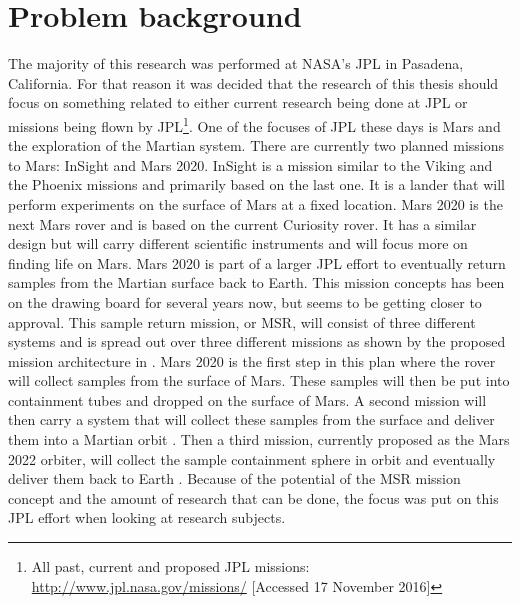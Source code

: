 \chapter{Problem background}

\label{ch:problembackground}
The majority of this research was performed at NASA's \ac{JPL} in Pasadena, California. For that reason it was decided that the research of this thesis should focus on something related to either current research being done at \ac{JPL} or missions being flown by \ac{JPL}\footnote{All past, current and proposed \ac{JPL} missions: \url{http://www.jpl.nasa.gov/missions/} [Accessed 17 November 2016]}.   One of the focuses of \ac{JPL} these days is Mars and the exploration of the Martian system. There are currently two planned missions to Mars: InSight and Mars 2020. InSight is a mission similar to the Viking and the Phoenix missions and primarily based on the last one. It is a lander that will perform experiments on the surface of Mars at a fixed location. Mars 2020 is the next Mars rover and is based on the current Curiosity rover. It has a similar design but will carry different scientific instruments and will focus more on finding life on Mars. Mars 2020 is part of a larger \ac{JPL} effort to eventually return samples from the Martian surface back to Earth. This mission concepts has been on the drawing board for several years now, but seems to be getting closer to approval. This sample return mission, or \ac{MSR}, will consist of three different systems and is spread out over three different missions as shown by the proposed mission architecture in . Mars 2020 is the first step in this plan where the rover will collect samples from the surface of Mars. These samples will then be put into containment tubes and dropped on the surface of Mars. A second mission will then carry a system that will collect these samples from the surface and deliver them into a Martian orbit \citep{shotwell2016drivers}. Then a third mission, currently proposed as the Mars 2022 orbiter, will collect the sample containment sphere in orbit and eventually deliver them back to Earth \citep{woolley2011mars}. Because of the potential of the \ac{MSR} mission concept and the amount of research that can be done, the focus was put on this \ac{JPL} effort when looking at research subjects.


